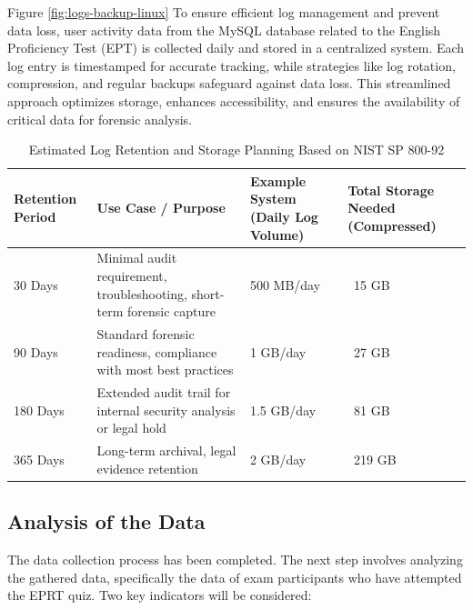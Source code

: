 Figure \ref{fig:logs-backup-linux} To ensure efficient log management and prevent data loss, user activity data from the MySQL database related to the English Proficiency Test (EPT) is collected daily and stored in a centralized system. Each log entry is timestamped for accurate tracking, while strategies like log rotation, compression, and regular backups safeguard against data loss. This streamlined approach optimizes storage, enhances accessibility, and ensures the availability of critical data for forensic analysis.

\begin{table}[H]
	\centering
	\caption{Estimated Log Retention and Storage Planning Based on NIST SP 800-92}
	\begin{tabular}{|p{3cm}|p{4.5cm}|p{4cm}|p{3cm}|}
		\hline
		\textbf{Retention Period} & \textbf{Use Case / Purpose} & \textbf{Example System (Daily Log Volume)} & \textbf{Total Storage Needed (Compressed)} \\
		\hline
		30 Days & Minimal audit requirement, troubleshooting, short-term forensic capture & 500 MB/day & ~15 GB \\
		\hline
		90 Days & Standard forensic readiness, compliance with most best practices & 1 GB/day & ~27 GB \\
		\hline
		180 Days & Extended audit trail for internal security analysis or legal hold & 1.5 GB/day & ~81 GB \\
		\hline
		365 Days & Long-term archival, legal evidence retention & 2 GB/day & ~219 GB \\
		\hline
	\end{tabular}
	\label{tab:log_retention_nist}
\end{table}


\subsection{Analysis of the Data}

The data collection process has been completed. The next step involves analyzing the gathered data, specifically the data of exam participants who have attempted the EPRT quiz. Two key indicators will be considered:


